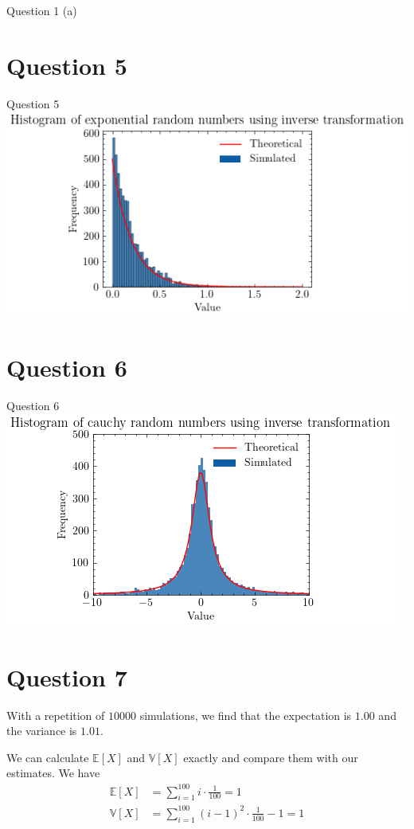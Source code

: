 \documentclass[compress,12pt]{beamer}
\begin{document}
\begin{frame}{Question 1 (a)}
\section{Question 5}
\begin{frame}{Question 5}
\centering
\includegraphics[scale=0.7]{imgs/exprv.png}
\end{frame}

\section{Question 6}
\begin{frame}{Question 6}
\centering
\includegraphics[scale=0.7]{imgs/cauchyrv.png}
\end{frame}

\section{Question 7}
\begin{frame}

With a repetition of $10000$ simulations, we find that {\color{red}the expectation is $1.00$} and {\color{red}the variance is $1.01$}.


We can calculate $\mathbb{E}[X]$ and $\mathbb{V}[X]$ exactly and compare them with our estimates. We have
\begin{align*}
    \mathbb{E}[X] &= \sum_{i=1}^{100} i \cdot \frac{1}{100} = 1 \\
    \mathbb{V}[X] &= \sum_{i=1}^{100} (i - 1)^2 \cdot \frac{1}{100} - 1 = 1
\end{align*}


\end{frame}
\end{frame}
\end{document}
